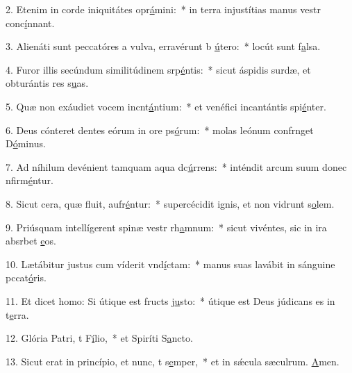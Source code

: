 2. Etenim in corde iniquitátes opr\uline{á}mini:~* in terra injustítias manus vestr conc\uline{í}nnant.\par 
3. Alienáti sunt peccatóres a vulva, erravérunt b \uline{ú}tero:~* locút sunt f\uline{a}lsa.\par 
4. Furor illis secúndum similitúdinem srp\uline{é}ntis:~* sicut áspidis surdæ, et obturántis res s\uline{u}as.\par 
5. Quæ non exáudiet vocem incnt\uline{á}ntium:~* et venéfici incantántis spi\uline{é}nter.\par 
6. Deus cónteret dentes eórum in ore ps\uline{ó}rum:~* molas leónum confrnget D\uline{ó}minus.\par 
7. Ad níhilum devénient tamquam aqua dc\uline{ú}rrens:~* inténdit arcum suum donec nfirm\uline{é}ntur.\par 
8. Sicut cera, quæ fluit, aufr\uline{é}ntur:~* supercécidit ignis, et non vidrunt s\uline{o}lem.\par 
9. Priúsquam intellígerent spinæ vestr rh\uline{a}mnum:~* sicut vivéntes, sic in ira absrbet \uline{e}os.\par 
10. Lætábitur justus cum víderit vnd\uline{í}ctam:~* manus suas lavábit in sánguine pccat\uline{ó}ris.\par 
11. Et dicet homo: Si útique est fructs j\uline{u}sto:~* útique est Deus júdicans es in t\uline{e}rra.\par 
12. Glória Patri, t F\uline{í}lio,~* et Spiríti S\uline{a}ncto.\par 
13. Sicut erat in princípio, et nunc, t s\uline{e}mper,~* et in sǽcula sæculrum. \uline{A}men.\par 
